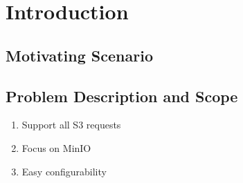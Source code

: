 \chapter{Introduction}

\section{Motivating Scenario}

\section{Problem Description and Scope}
\begin{enumerate}
\item Support all S3 requests
\item Focus on MinIO
\item Easy configurability
\end{enumerate}